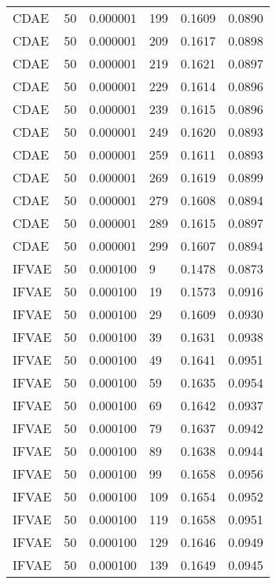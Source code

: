 \begin{tabular}{llrlrr}
    CDAE &   50 &  0.000001 &   199 &  0.1609 &       0.0890 \\
    CDAE &   50 &  0.000001 &   209 &  0.1617 &       0.0898 \\
    CDAE &   50 &  0.000001 &   219 &  0.1621 &       0.0897 \\
    CDAE &   50 &  0.000001 &   229 &  0.1614 &       0.0896 \\
    CDAE &   50 &  0.000001 &   239 &  0.1615 &       0.0896 \\
    CDAE &   50 &  0.000001 &   249 &  0.1620 &       0.0893 \\
    CDAE &   50 &  0.000001 &   259 &  0.1611 &       0.0893 \\
    CDAE &   50 &  0.000001 &   269 &  0.1619 &       0.0899 \\
    CDAE &   50 &  0.000001 &   279 &  0.1608 &       0.0894 \\
    CDAE &   50 &  0.000001 &   289 &  0.1615 &       0.0897 \\
    CDAE &   50 &  0.000001 &   299 &  0.1607 &       0.0894 \\
   IFVAE &   50 &  0.000100 &     9 &  0.1478 &       0.0873 \\
   IFVAE &   50 &  0.000100 &    19 &  0.1573 &       0.0916 \\
   IFVAE &   50 &  0.000100 &    29 &  0.1609 &       0.0930 \\
   IFVAE &   50 &  0.000100 &    39 &  0.1631 &       0.0938 \\
   IFVAE &   50 &  0.000100 &    49 &  0.1641 &       0.0951 \\
   IFVAE &   50 &  0.000100 &    59 &  0.1635 &       0.0954 \\
   IFVAE &   50 &  0.000100 &    69 &  0.1642 &       0.0937 \\
   IFVAE &   50 &  0.000100 &    79 &  0.1637 &       0.0942 \\
   IFVAE &   50 &  0.000100 &    89 &  0.1638 &       0.0944 \\
   IFVAE &   50 &  0.000100 &    99 &  0.1658 &       0.0956 \\
   IFVAE &   50 &  0.000100 &   109 &  0.1654 &       0.0952 \\
   IFVAE &   50 &  0.000100 &   119 &  0.1658 &       0.0951 \\
   IFVAE &   50 &  0.000100 &   129 &  0.1646 &       0.0949 \\
   IFVAE &   50 &  0.000100 &   139 &  0.1649 &       0.0945 \\

\end{tabular}
